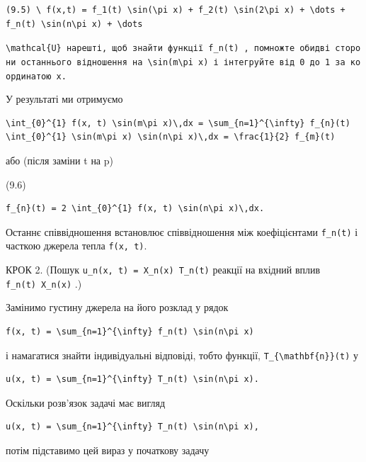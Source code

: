 \documentclass[
  ukrainian,
]{article}
\begin{document}
\begin{verbatim}
(9.5) \ f(x,t) = f_1(t) \sin(\pi x) + f_2(t) \sin(2\pi x) + \dots + f_n(t) \sin(n\pi x) + \dots
\end{verbatim}

\texttt{\textquotesingle{}\textbackslash{}mathcal\{U\}\textquotesingle{}\ нарешті,\ щоб\ знайти\ функції\ \textquotesingle{}f\_n(t)\textquotesingle{}\ ,\ помножте\ обидві\ сторони\ останнього\ відношення\ на\ \textquotesingle{}\textbackslash{}sin(m\textbackslash{}pi\ x)\textquotesingle{}\ і\ інтегруйте\ від\ 0\ до\ 1\ за\ координатою\ x.}

У результаті ми отримуємо

\begin{verbatim}
\int_{0}^{1} f(x, t) \sin(m\pi x)\,dx = \sum_{n=1}^{\infty} f_{n}(t) \int_{0}^{1} \sin(m\pi x) \sin(n\pi x)\,dx = \frac{1}{2} f_{m}(t)
\end{verbatim}

або (після заміни t на p)

(9.6)

\begin{verbatim}
f_{n}(t) = 2 \int_{0}^{1} f(x, t) \sin(n\pi x)\,dx.
\end{verbatim}

Останнє співвідношення встановлює співвідношення між коефіцієнтами
\texttt{f\_n(t)} і часткою джерела тепла \texttt{f(x,\ t)}.

КРОК 2. (Пошук \texttt{u\_n(x,\ t)\ =\ X\_n(x)\ T\_n(t)} реакції на
вхідний вплив \texttt{f\_n(t)\ X\_n(x)} .)

Замінимо густину джерела на його розклад у рядок

\begin{verbatim}
f(x, t) = \sum_{n=1}^{\infty} f_n(t) \sin(n\pi x)
\end{verbatim}

і намагатися знайти індивідуальні відповіді, тобто функції,
\texttt{T\_\{\textbackslash{}mathbf\{n\}\}(t)} у

\begin{verbatim}
u(x, t) = \sum_{n=1}^{\infty} T_n(t) \sin(n\pi x).
\end{verbatim}

Оскільки розв'язок задачі має вигляд

\begin{verbatim}
u(x, t) = \sum_{n=1}^{\infty} T_n(t) \sin(n\pi x),
\end{verbatim}

потім підставимо цей вираз у початкову задачу
\end{document}
